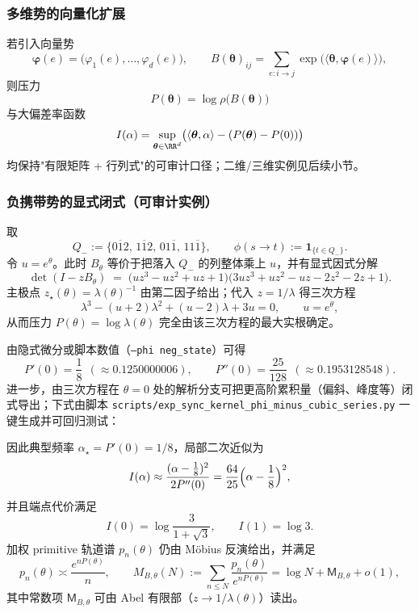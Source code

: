 \subsubsection{多维势的向量化扩展}\label{app:vector-potential}
若引入向量势
\[
\boldsymbol{\varphi}(e)=\bigl(\varphi_1(e),\dots,\varphi_d(e)\bigr),
\qquad
B(\boldsymbol{\theta})_{ij}=\sum_{e:i\to j}\exp\!\bigl(\langle\boldsymbol{\theta},\boldsymbol{\varphi}(e)\rangle\bigr),
\]
则压力
\[
P(\boldsymbol{\theta})=\log\rho\bigl(B(\boldsymbol{\theta})\bigr)
\]
与大偏差率函数
\[
I(\alpha)=\sup_{\boldsymbol{\theta}\in\RR^d}\bigl(\langle\boldsymbol{\theta},\alpha\rangle-(P(\boldsymbol{\theta})-P(0))\bigr)
\]
均保持"有限矩阵 + 行列式"的可审计口径；二维/三维实例见后续小节。

\subsubsection{负携带势的显式闭式（可审计实例）}
取
\[
Q_-:=\{0\overline{1}2,\,1\overline{1}2,\,01\overline{1},\,11\overline{1}\},
\qquad
\phi(s\to t):=\mathbf{1}_{\{t\in Q_-\}}.
\]
令 $u=e^\theta$。此时 $B_\theta$ 等价于把落入 $Q_-$ 的列整体乘上 $u$，并有显式因式分解
\[
\det(I-zB_\theta)
\;=\;
\bigl(u z^3-u z^2+u z+1\bigr)\bigl(3u z^3+u z^2-u z-2z^2-2z+1\bigr).
\]
主极点 $z_\star(\theta)=\lambda(\theta)^{-1}$ 由第二因子给出；代入 $z=1/\lambda$ 得三次方程
\[
\lambda^3-(u+2)\lambda^2+(u-2)\lambda+3u=0,\qquad u=e^\theta,
\]
从而压力 $P(\theta)=\log\lambda(\theta)$ 完全由该三次方程的最大实根确定。

由隐式微分或脚本数值（\texttt{--phi neg\_state}）可得
\[
P'(0)=\frac{1}{8}\ \ (\approx 0.1250000006),\qquad
P''(0)=\frac{25}{128}\ \ (\approx 0.1953128548).
\]
进一步，由三次方程在 \(\theta=0\) 处的解析分支可把更高阶累积量（偏斜、峰度等）闭式导出；下式由脚本 \texttt{scripts/exp\_sync\_kernel\_phi\_minus\_cubic\_series.py} 一键生成并可回归测试：


因此典型频率 $\alpha_\star=P'(0)=1/8$，局部二次近似为
\[
I(\alpha)\approx \frac{(\alpha-\frac18)^2}{2P''(0)}=\frac{64}{25}\Bigl(\alpha-\frac18\Bigr)^2,
\]
并且端点代价满足
\[
I(0)=\log\frac{3}{1+\sqrt3},\qquad I(1)=\log 3.
\]
加权 primitive 轨道谱 $p_n(\theta)$ 仍由 Möbius 反演给出，并满足
\[
p_n(\theta)\asymp \frac{e^{nP(\theta)}}{n},
\qquad
M_{B,\theta}(N):=\sum_{n\le N}\frac{p_n(\theta)}{e^{nP(\theta)}}=\log N+\mathsf{M}_{B,\theta}+o(1),
\]
其中常数项 $\mathsf{M}_{B,\theta}$ 可由 Abel 有限部（$z\to 1/\lambda(\theta)$）读出。

